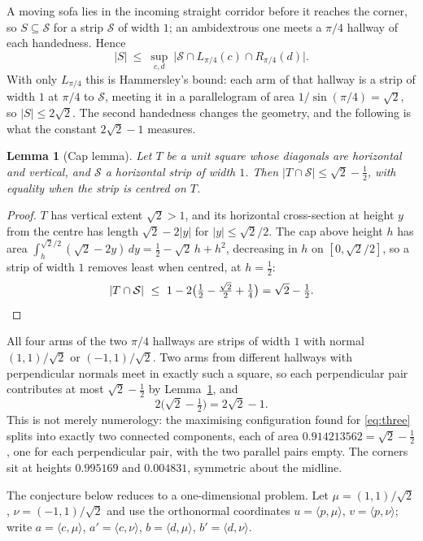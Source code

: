 \documentclass[11pt]{article}
\newtheorem{lemma}[theorem]{Lemma}
\theoremstyle{definition}
\begin{document}
A moving sofa lies in the incoming straight corridor before it reaches the corner, so
$S\subseteq\mathcal S$ for a strip $\mathcal S$ of width $1$; an ambidextrous one meets a
$\pi/4$ hallway of each handedness. Hence
\begin{equation}\label{eq:three}
  |S|\ \le\ \sup_{c,d}\ \bigl|\mathcal S\cap L_{\pi/4}(c)\cap R_{\pi/4}(d)\bigr| .
\end{equation}
With only $L_{\pi/4}$ this is Hammersley's bound: each arm of that hallway is a strip of
width $1$ at $\pi/4$ to $\mathcal S$, meeting it in a parallelogram of area
$1/\sin(\pi/4)=\sqrt2$, so $|S|\le2\sqrt2$. The second handedness changes the geometry,
and the following is what the constant $2\sqrt2-1$ measures.

\begin{lemma}[Cap lemma]\label{lem:cap}
Let $T$ be a unit square whose diagonals are horizontal and vertical, and $\mathcal S$ a
horizontal strip of width $1$. Then $|T\cap\mathcal S|\le\sqrt2-\tfrac12$, with equality
when the strip is centred on $T$.
\end{lemma}

\begin{proof}
$T$ has vertical extent $\sqrt2>1$, and its horizontal cross-section at height $y$ from
the centre has length $\sqrt2-2|y|$ for $|y|\le\sqrt2/2$. The cap above height $h$ has
area $\int_h^{\sqrt2/2}(\sqrt2-2y)\,dy=\tfrac12-\sqrt2\,h+h^2$, decreasing in $h$ on
$[0,\sqrt2/2]$, so a strip of width $1$ removes least when centred, at $h=\tfrac12$:
\[
  |T\cap\mathcal S|\ \le\ 1-2\bigl(\tfrac12-\tfrac{\sqrt2}2+\tfrac14\bigr)=\sqrt2-\tfrac12 . \qedhere
\]
\end{proof}

All four arms of the two $\pi/4$ hallways are strips of width $1$ with normal
$(1,1)/\sqrt2$ or $(-1,1)/\sqrt2$. Two arms from different hallways with perpendicular
normals meet in exactly such a square, so each perpendicular pair contributes at most
$\sqrt2-\tfrac12$ by Lemma~\ref{lem:cap}, and
\[
  2\bigl(\sqrt2-\tfrac12\bigr)=2\sqrt2-1 .
\]
This is not merely numerology: the maximising configuration found for \eqref{eq:three}
splits into exactly two connected components, each of area $0.914213562=\sqrt2-\tfrac12$,
one for each perpendicular pair, with the two parallel pairs empty. The corners sit at
heights $0.995169$ and $0.004831$, symmetric about the midline.

The conjecture below reduces to a one-dimensional problem. Let $\mu=(1,1)/\sqrt2$,
$\nu=(-1,1)/\sqrt2$ and use the orthonormal coordinates $u=\langle p,\mu\rangle$,
$v=\langle p,\nu\rangle$; write $a=\langle c,\mu\rangle$, $a'=\langle c,\nu\rangle$,
$b=\langle d,\mu\rangle$, $b'=\langle d,\nu\rangle$.
\end{document}
